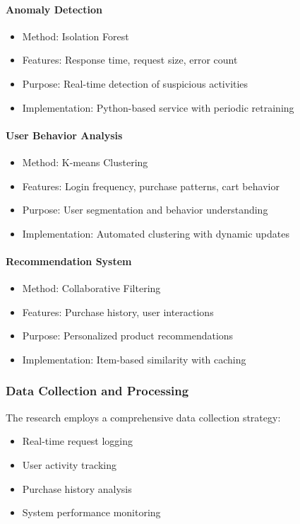\documentclass[12pt]{article}
\begin{document}
\paragraph{Anomaly Detection}
\begin{itemize}
    \item Method: Isolation Forest
    \item Features: Response time, request size, error count
    \item Purpose: Real-time detection of suspicious activities
    \item Implementation: Python-based service with periodic retraining
\end{itemize}

\paragraph{User Behavior Analysis}
\begin{itemize}
    \item Method: K-means Clustering
    \item Features: Login frequency, purchase patterns, cart behavior
    \item Purpose: User segmentation and behavior understanding
    \item Implementation: Automated clustering with dynamic updates
\end{itemize}

\paragraph{Recommendation System}
\begin{itemize}
    \item Method: Collaborative Filtering
    \item Features: Purchase history, user interactions
    \item Purpose: Personalized product recommendations
    \item Implementation: Item-based similarity with caching
\end{itemize}

\subsubsection{Data Collection and Processing}
The research employs a comprehensive data collection strategy:
\begin{itemize}
    \item Real-time request logging
    \item User activity tracking
    \item Purchase history analysis
    \item System performance monitoring
\end{itemize}
\end{document}
